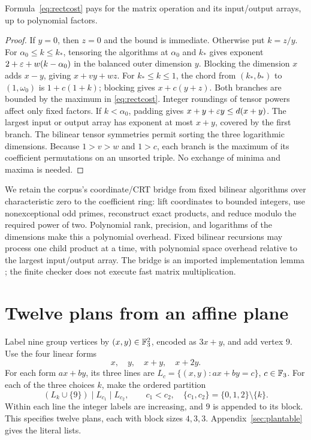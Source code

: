 \begin{lemma}\label{lem:rect}
Formula~\eqref{eq:rectcost} pays for the matrix operation and its
input/output arrays, up to polynomial factors.
\end{lemma}
\begin{proof}
If \(y=0\), then \(z=0\) and the bound is immediate. Otherwise put
\(k=z/y\).
For \(\alpha_0\le k\le k_*\), tensoring the algorithms at
\(\alpha_0\) and \(k_*\) gives exponent
\(2+\varepsilon+w(k-\alpha_0)\) in the balanced outer dimension \(y\).
Blocking the dimension \(x\) adds \(x-y\), giving \(x+vy+wz\).
For \(k_*\le k\le1\), the chord from \((k_*,b_*)\) to
\((1,\omega_0)\) is \(1+c(1+k)\); blocking gives \(x+c(y+z)\).
Both branches are bounded by the maximum in \eqref{eq:rectcost}.
Integer roundings of tensor powers affect only fixed factors.
If \(k<\alpha_0\), padding gives
\(x+y+\varepsilon y\le d(x+y)\).
The largest input or output array has exponent at most \(x+y\), covered
by the first branch. The bilinear tensor symmetries permit sorting the
three logarithmic dimensions. Because \(1>v>w\) and \(1>c\), each
branch is the maximum of its coefficient permutations on an unsorted
triple. No exchange of minima and maxima is needed.
\end{proof}

We retain the corpus's coordinate/CRT bridge from fixed bilinear algorithms
over characteristic zero to the coefficient ring: lift coordinates to
bounded integers, use nonexceptional odd primes, reconstruct exact
products, and reduce modulo the required power of two. Polynomial rank,
precision, and logarithms of the dimensions make this a polynomial
overhead. Fixed bilinear recursions may process one child product at a time,
with polynomial space overhead relative to the largest input/output array.
The bridge is an imported implementation lemma \cite{rectangular};
the finite checker does not execute fast matrix multiplication.

\section{Twelve plans from an affine plane}\label{sec:plans}

Label nine group vertices by \((x,y)\in\mathbb F_3^2\), encoded as \(3x+y\),
and add vertex \(9\). Use the four linear forms
\[
 x,\quad y,\quad x+y,\quad x+2y.
\]
For each form \(a x+b y\), its three lines are
\(L_c=\{(x,y):ax+by=c\}\), \(c\in\mathbb F_3\).
For each of the three choices \(k\), make the ordered partition
\begin{equation}\label{eq:affineplans}
 (L_k\cup\{9\})\mid L_{c_1}\mid L_{c_2},
 \qquad c_1<c_2,\quad \{c_1,c_2\}=\{0,1,2\}\setminus\{k\}.
\end{equation}
Within each line the integer labels are increasing, and \(9\) is appended
to its block. This specifies twelve plans, each with block sizes \(4,3,3\).
Appendix~\ref{sec:plantable} gives the literal lists.

